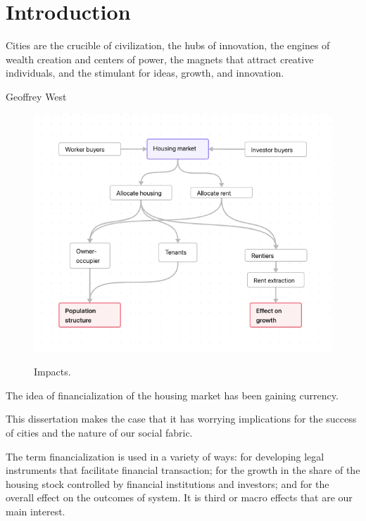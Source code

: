 \chapter{Introduction} \label{chapter-introduction}




\epigraph{Cities are the crucible of civilization, the hubs of innovation, the engines of wealth creation and centers of power, the magnets that attract creative individuals, and the stimulant for ideas, growth, and innovation.}{Geoffrey West}

\begin{figure}[!ht]
    \centering
    \includegraphics[scale=.60]{fig/flow_impacts.png}
    \label{Figure-impacts}
\caption{Impacts.}
\end{figure}


 The idea of financialization of the housing market has been gaining currency. 
 
 This dissertation makes the case that it has worrying implications for the success of cities and the nature of our social fabric. 
 
 The term financialization is used in a variety of ways:  for developing legal instruments that facilitate financial transaction;  for the growth in the share of the housing stock controlled by financial institutions and investors; and for the overall effect on the outcomes of system. It is third or  macro effects that are our main interest. 

